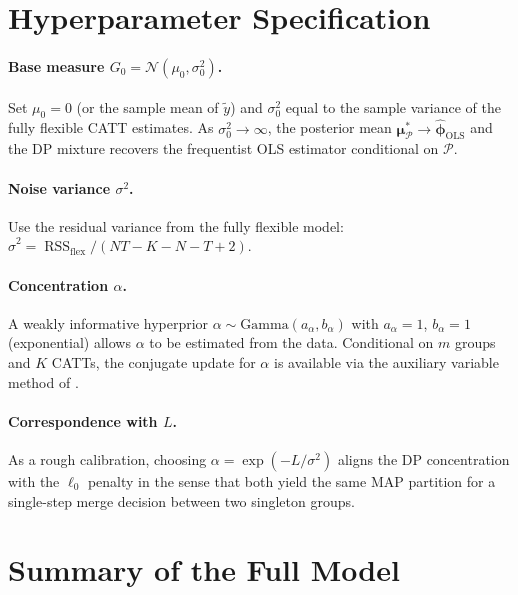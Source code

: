 \documentclass[12pt]{article}
\DeclareMathOperator{\RSS}{RSS}
\newcommand{\Normal}{\mathcal{N}}
\newcommand{\1}{\mathbbm{1}}
\newcommand{\ytd}{\tilde{y}}
\begin{document}
\section{Hyperparameter Specification}

\paragraph{Base measure $G_0 = \Normal(\mu_0, \sigma_0^2)$.}
Set $\mu_0 = 0$ (or the sample mean of $\ytd$) and $\sigma_0^2$ equal to the
sample variance of the fully flexible CATT estimates. As $\sigma_0^2\to\infty$,
the posterior mean $\bm{\mu}_{\mathcal{P}}^*\to\hat{\bm{\phi}}_{\mathrm{OLS}}$
and the DP mixture recovers the frequentist OLS estimator conditional on
$\mathcal{P}$.

\paragraph{Noise variance $\sigma^2$.}
Use the residual variance from the fully flexible model:
$\hat\sigma^2 = \RSS_{\mathrm{flex}} / (NT - K - N - T + 2)$.

\paragraph{Concentration $\alpha$.}
A weakly informative hyperprior $\alpha\sim\mathrm{Gamma}(a_\alpha, b_\alpha)$
with $a_\alpha = 1$, $b_\alpha = 1$ (exponential) allows $\alpha$ to be
estimated from the data. Conditional on $m$ groups and $K$ CATTs, the
conjugate update for $\alpha$ is available via the auxiliary variable method
of \citet{escobar1995}.

\paragraph{Correspondence with $L$.}
As a rough calibration, choosing $\alpha = \exp(-L/\sigma^2)$ aligns the DP
concentration with the $\ell_0$ penalty in the sense that both yield the same
MAP partition for a single-step merge decision between two singleton groups.

\section{Summary of the Full Model}
\end{document}
